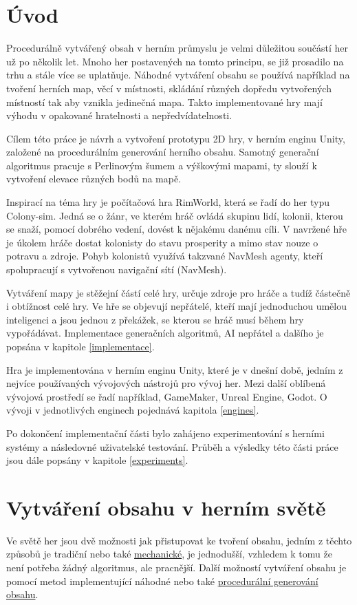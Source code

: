 
\chapter*{Úvod}
Procedurálně vytvářený obsah v herním průmyslu je velmi důležitou součástí her už po několik let. Mnoho her postavených na tomto principu, se již prosadilo na trhu a stále více se uplatňuje. Náhodné vytváření obsahu se používá například na tvoření herních map, věcí v místnosti, skládání různých dopředu vytvořených místností tak aby vznikla jedinečná mapa. Takto implementované hry mají výhodu v opakované hratelnosti a nepředvídatelnosti.

Cílem této práce je návrh a vytvoření prototypu 2D hry, v herním enginu Unity, založené na procedurálním generování herního obsahu. Samotný generační algoritmus pracuje s Perlinovým šumem a výškovými mapami, ty slouží k vytvoření elevace různých bodů na mapě.

Inspirací na téma hry je počítačová hra RimWorld, která se řadí do her typu Colony-sim. Jedná se o žánr, ve kterém hráč ovládá skupinu lidí, kolonii, kterou se snaží, pomocí dobrého vedení, dovést k nějakému danému cíli. V navržené hře je úkolem hráče dostat kolonisty do stavu prosperity a mimo stav nouze o potravu a zdroje. Pohyb kolonistů využívá takzvané NavMesh agenty, kteří spolupracují s vytvořenou navigační sítí (NavMesh).

Vytváření mapy je stěžejní částí celé hry, určuje zdroje pro hráče a tudíž částečně i obtížnost celé hry. Ve hře se objevují nepřátelé, kteří mají jednoduchou umělou inteligenci a jsou jednou z překážek, se kterou se hráč musí během hry vypořádávat. Implementace generačních algoritmů, AI nepřátel a dalšího je popsána v kapitole \ref{implementace}.

Hra je implementována v herním enginu Unity, které je v dnešní době, jedním z nejvíce používaných vývojových nástrojů pro vývoj her. Mezi další oblíbená vývojová prostředí se řadí například, GameMaker, Unreal Engine, Godot. O vývoji v jednotlivých enginech pojednává kapitola \ref{engines}.

Po dokončení implementační části bylo zahájeno experimentování s herními systémy a následovné uživatelské testování. Průběh a výsledky této části práce jsou dále popsány v kapitole \ref{experiments}.

\chapter{Vytváření obsahu v herním světě} 
\label{theory}
Ve světě her jsou dvě možnosti jak přistupovat ke tvoření obsahu, jedním z těchto způsobů je tradiční nebo také \hyperref[traditional]{mechanické}, je jednodušší, vzhledem k tomu že není potřeba žádný algoritmus, ale pracnější. Další možností vytváření obsahu je pomocí metod implementující náhodné nebo také \hyperref[procedural]{procedurální generování obsahu}. 

